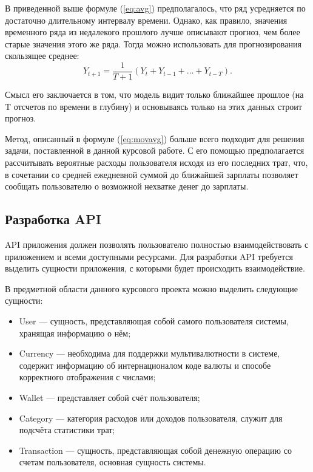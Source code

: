 В приведенной выше формуле (\ref{eq:avg}) предполагалось, что ряд усредняется по достаточно длительному 
интервалу времени. Однако, как правило, значения временного ряда из недалекого прошлого лучше описывают 
прогноз, чем более старые значения этого же ряда. Тогда можно использовать для прогнозирования скользящее среднее:
\begin{equation} 
Y_{t+1}=\frac{1}{T+1}(Y_t+Y_{t-1}+...+Y_{t-T}). \label{eq:movavg}
\end{equation}

Смысл его заключается в том, что модель видит только ближайшее прошлое (на T отсчетов по времени в глубину) 
и основываясь только на этих данных строит прогноз.

Метод, описанный в формуле (\ref{eq:movavg}) больше всего подходит для решения задачи, поставленной в данной 
курсовой работе. С его помощью предполагается рассчитывать вероятные расходы пользователя исходя из его последних трат, 
что, в сочетании со средней ежедневной суммой до ближайшей зарплаты позволяет сообщать пользователю о возможной нехватке 
денег до зарплаты.

\subsection{Разработка API}
\label{sec:api}

API приложения должен позволять пользователю полностью взаимодействовать с приложением и всеми доступными 
ресурсами. Для разработки API требуется выделить сущности приложения, с которыми будет происходить взаимодействие.

В предметной области данного курсового проекта можно выделить следующие сущности:
\begin{itemize}
  \item User --- сущность, представляющая собой самого пользователя системы, хранящая информацию о нём;
  \item Currency --- необходима для поддержки мультивалютности в системе, содержит информацию об интернационалом 
  коде валюты и способе корректного отображения с числами;
  \item Wallet --- представляет собой счёт пользователя;
  \item Category --- категория расходов или доходов пользователя, служит для подсчёта статистики трат;
  \item Transaction --- сущность, представляющая собой денежную операцию со счетам пользователя, основная 
  сущность системы.
\end{itemize}

